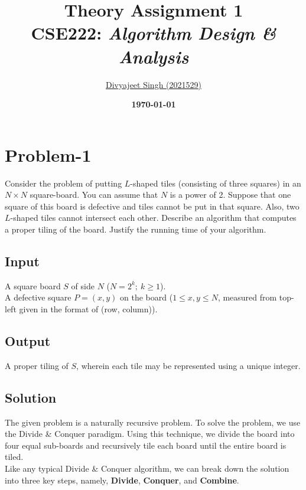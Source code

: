 \documentclass[12pt]{report}
\title{
    \textbf{\Huge{Theory Assignment 1}} \\
    \vspace*{15pt}
    \large{CSE222: \textit{Algorithm Design \& Analysis}}
}
\author{
    \href{mailto:divyajeet21529@iiitd.ac.in}{Divyajeet Singh (2021529)}
}
\date{
    \vspace*{10pt}
    \textbf{\today}
}
\begin{document}
    \maketitle

    \section*{\huge{Problem-1}}
    Consider the problem of putting $L$-shaped tiles (consisting of three squares) in an $N \times N$ square-board.
    You can assume that $N$ is a power of 2.
    Suppose that one square of this board is defective and tiles cannot be put in that square.
    Also, two $L$-shaped tiles cannot intersect each other.
    Describe an algorithm that computes a proper tiling of the board.
    Justify the running time of your algorithm.

    \subsection*{Input}
    A square board $S$ of side $N$ ($N = 2^{k}; \ k \ge 1$). \\
    A defective square $P = (x, y)$ on the board ($1 \le x, y \le N$, measured from top-left given in the format of (row, column)).

    \subsection*{Output}
    A proper tiling of $S$, wherein each tile may be represented using a unique integer.

    \subsection*{Solution}
    The given problem is a naturally recursive problem.
    To solve the problem, we use the Divide \& Conquer paradigm.
    Using this technique, we divide the board into four equal sub-boards and recursively
    tile each board until the entire board is tiled.
    \vspace*{10pt} \\
    Like any typical Divide \& Conquer algorithm, we can break down the solution into three key steps,
    namely, \textbf{Divide}, \textbf{Conquer}, and \textbf{Combine}.
\end{document}
